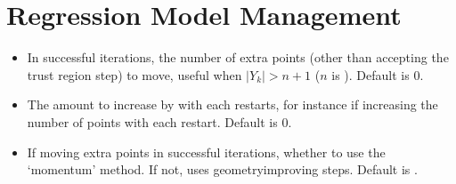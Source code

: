 \documentclass[letterpaper,10pt,english]{sphinxmanual}
\begin{document}
\section{Regression Model Management}
\label{\detokenize{advanced:regression-model-management}}\begin{itemize}
\item {} 
 \sphinxhyphen{} In successful iterations, the number of extra points (other than accepting the trust region step) to move, useful when \(|Y_k|>n+1\) (\(n\) is ). Default is 0.

\item {} 
 \sphinxhyphen{} The amount to increase  by with each restarts, for instance if increasing the number of points with each restart. Default is 0.

\item {} 
 \sphinxhyphen{} If moving extra points in successful iterations, whether to use the ‘momentum’ method. If not, uses geometry\sphinxhyphen{}improving steps. Default is .

\end{itemize}
\end{document}

